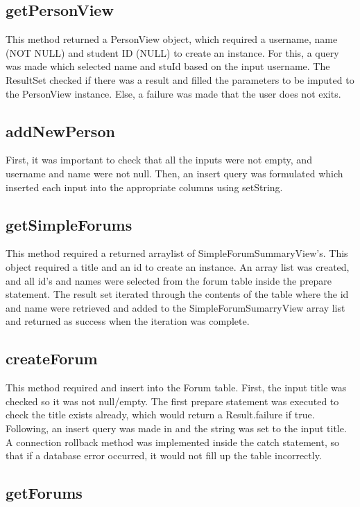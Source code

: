 \documentclass{article}
\begin{document}
\subsection*{getPersonView}

This method returned a PersonView object, which required a username, name (NOT NULL) and student ID (NULL) to create an instance. For this, a query was made which selected name and stuId based on the input username. The ResultSet checked if there was a result and filled the parameters to be imputed to the PersonView instance. Else, a failure was made that the user does not exits.

\subsection*{addNewPerson}

First, it was important to check that all the inputs were not empty, and username and name were not null. Then, an insert query was formulated which inserted each input into the appropriate columns using setString.

\subsection*{getSimpleForums}

This method required a returned arraylist of SimpleForumSummaryView's. This object required a title and an id to create an instance. An array list was created, and all id's and names were selected from the forum table inside the prepare statement. The result set iterated through the contents of the table where the id and name were retrieved and added to the SimpleForumSumarryView array list and returned as success when the iteration was complete.
\subsection*{createForum}

This method required and insert into the Forum table. First, the input title was checked so it was not null/empty. The first prepare statement was executed to check the title exists already, which would return a Result.failure if true. Following, an insert query was made in and the string was set to the input title. A connection rollback method was implemented inside the catch statement, so that if a database error occurred, it would not fill up the table incorrectly.

\subsection*{getForums}
\end{document}
